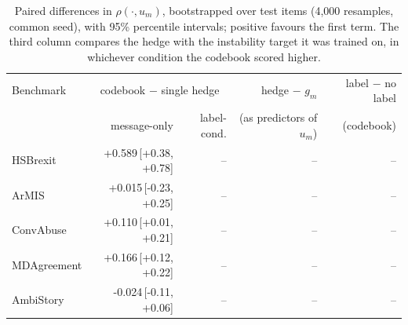 \begin{table}[t]
\centering
\small
\begin{tabular}{lrrrr}
\hline
Benchmark & \multicolumn{2}{c}{codebook $-$ single hedge} & hedge $-$ $g_m$ & label $-$ no label \\
 & message-only & label-cond. & (as predictors of $u_m$) & (codebook) \\
\hline
HSBrexit & +0.589{\scriptsize\,[+0.38, +0.78]} & -- & -- & -- \\
ArMIS & +0.015{\scriptsize\,[-0.23, +0.25]} & -- & -- & -- \\
ConvAbuse & +0.110{\scriptsize\,[+0.01, +0.21]} & -- & -- & -- \\
MDAgreement & +0.166{\scriptsize\,[+0.12, +0.22]} & -- & -- & -- \\
AmbiStory & -0.024{\scriptsize\,[-0.11, +0.06]} & -- & -- & -- \\
\hline
\end{tabular}
\caption{Paired differences in $\rho(\cdot,u_m)$, bootstrapped over test items (4,000 resamples, common seed), with 95\% percentile intervals; positive favours the first term. The third column compares the hedge with the instability target it was trained on, in whichever condition the codebook scored higher.}
\label{tab:paired}
\end{table}